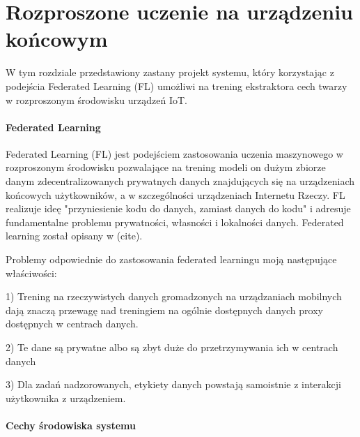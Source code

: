 \newpage
\section{Rozproszone uczenie na urządzeniu końcowym}

W tym rozdziale przedstawiony zastany projekt systemu, który korzystając z podejścia Federated  Learning (FL) umożliwi na trening ekstraktora cech twarzy w rozproszonym środowisku urządzeń IoT.


\paragraph{Federated Learning}

Federated Learning (FL) jest podejściem zastosowania uczenia maszynowego w rozproszonym
środowisku pozwalające na trening modeli on dużym zbiorze danym zdecentralizowanych prywatnych
danych znajdujących się na urządzeniach końcowych użytkowników, a w szczególności urządzeniach
Internetu Rzeczy. FL realizuje ideę "przyniesienie kodu do danych, zamiast danych do kodu" i
adresuje fundamentalne problemu prywatności, własności i lokalności danych. Federated learning
został opisany w (cite).

Problemy odpowiednie do zastosowania federated learningu moją następujące właściwości:

1) Trening na rzeczywistych danych gromadzonych na urządzaniach mobilnych dają znaczą przewagę
nad treningiem na ogólnie dostępnych danych proxy dostępnych w centrach danych.

2) Te dane są prywatne albo są zbyt duże do przetrzymywania ich w centrach danych

3) Dla zadań nadzorowanych, etykiety danych powstają samoistnie z interakcji użytkownika z urządzeniem.

\paragraph{Cechy środowiska systemu}


